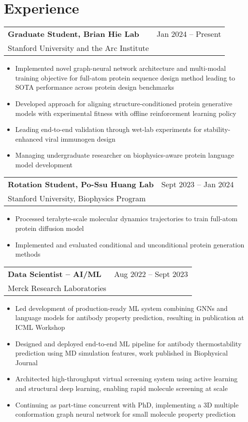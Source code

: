 \documentclass[11pt, a4paper]{article}
\makeatletter
\newcommand{\datewidth}{1.5in}
\newcommand{\position}[4]{%
    \noindent\begin{tabular}{@{}p{\dimexpr\textwidth-\datewidth}p{\datewidth}@{}}
    \textbf{#1} & #2\\
    #3 &\\
    \end{tabular}
    #4
    \vspace{1.2em}
}
\makeatother
\begin{document}
\section{Experience}
\position{Graduate Student, Brian Hie Lab}{Jan 2024 -- Present}{Stanford University and the Arc Institute}{
\begin{itemize}[leftmargin=*,nosep,itemsep=2pt]
    \item Implemented novel graph-neural network architecture and multi-modal training objective for full-atom protein sequence design method leading to SOTA performance across protein design benchmarks
    \item Developed approach for aligning structure-conditioned protein generative models with experimental fitness with offline reinforcement learning policy
    \item Leading end-to-end validation through wet-lab experiments for stability-enhanced viral immunogen design
    \item Managing undergraduate researcher on biophysics-aware protein language model development
\end{itemize}}

\position{Rotation Student, Po-Ssu Huang Lab}{Sept 2023 -- Jan 2024}{Stanford University, Biophysics Program}{
\begin{itemize}[leftmargin=*,nosep,itemsep=2pt]
    \item Processed terabyte-scale molecular dynamics trajectories to train full-atom protein diffusion model
    \item Implemented and evaluated conditional and unconditional protein generation methods
\end{itemize}}

\position{Data Scientist -- AI/ML}{Aug 2022 -- Sept 2023}{Merck Research Laboratories}{
\begin{itemize}[leftmargin=*,nosep,itemsep=2pt]
    \item Led development of production-ready ML system combining GNNs and language models for antibody property prediction, resulting in publication at ICML Workshop
    \item Designed and deployed end-to-end ML pipeline for antibody thermostability prediction using MD simulation features, work published in Biophysical Journal
    \item Architected high-throughput virtual screening system using active learning and structural deep learning, enabling rapid molecule screening at scale
    \item Continuing as part-time concurrent with PhD, implementing a 3D multiple conformation graph neural network for small molecule property prediction
\end{itemize}}
\end{document}
